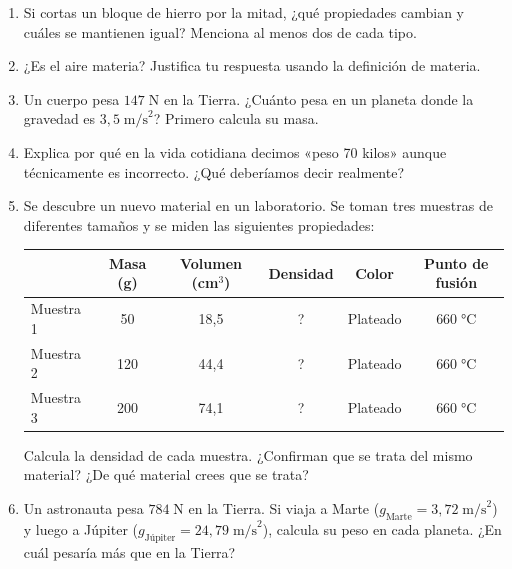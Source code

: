 \documentclass[12pt, letterpaper]{article}
\begin{document}
\begin{enumerate}[leftmargin=*, resume]
  \item \medio{} Si cortas un bloque de hierro por la mitad, ¿qué propiedades cambian y cuáles se mantienen igual? Menciona al menos dos de cada tipo.

  \item \medio{} ¿Es el aire materia? Justifica tu respuesta usando la definición de materia.

  \item \dificil{} Un cuerpo pesa $147\;\text{N}$ en la Tierra. ¿Cuánto pesa en un planeta donde la gravedad es $3{,}5\;\text{m/s}^2$? Primero calcula su masa.

  \item \dificil{} Explica por qué en la vida cotidiana decimos «peso 70 kilos» aunque técnicamente es incorrecto. ¿Qué deberíamos decir realmente?

  \item \dificil{} Se descubre un nuevo material en un laboratorio. Se toman tres muestras de diferentes tamaños y se miden las siguientes propiedades:
        \begin{center}
          \small
          \begin{tabular}{lccccc}
            \toprule
                      & Masa (g) & Volumen (cm$^3$) & Densidad & Color    & Punto de fusión \\
            \midrule
            Muestra 1 & 50       & 18{,}5           & ?        & Plateado & $660\;°$C       \\
            Muestra 2 & 120      & 44{,}4           & ?        & Plateado & $660\;°$C       \\
            Muestra 3 & 200      & 74{,}1           & ?        & Plateado & $660\;°$C       \\
            \bottomrule
          \end{tabular}
        \end{center}
        Calcula la densidad de cada muestra. ¿Confirman que se trata del mismo material? ¿De qué material crees que se trata?

  \item \dificil{} Un astronauta pesa $784\;\text{N}$ en la Tierra. Si viaja a Marte ($g_{\text{Marte}} = 3{,}72\;\text{m/s}^2$) y luego a Júpiter ($g_{\text{Júpiter}} = 24{,}79\;\text{m/s}^2$), calcula su peso en cada planeta. ¿En cuál pesaría más que en la Tierra?
\end{enumerate}


\end{document}
